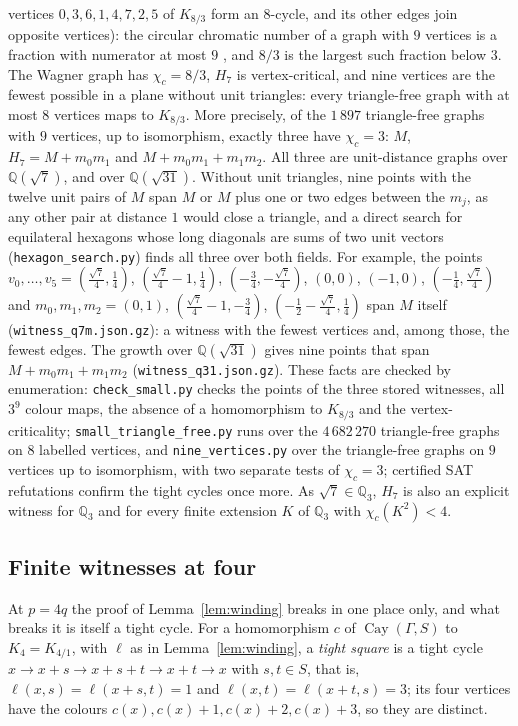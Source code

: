 \documentclass[11pt,a4paper]{amsart}
\theoremstyle{remark}
\newcommand{\Q}{\mathbb{Q}}
\newcommand{\Cay}{\operatorname{Cay}}
\begin{document}
vertices $0,3,6,1,4,7,2,5$ of $K_{8/3}$ form an $8$-cycle, and its other edges join opposite vertices): the
circular chromatic number of a graph with $9$ vertices is a fraction with numerator at most $9$
\cite{Vince,BondyHell,Zhu}, and
$8/3$ is the largest such fraction below $3$. The Wagner graph has $\chi_c=8/3$, $H_7$ is vertex-critical, and nine
vertices are the fewest possible in a plane without unit triangles: every triangle-free graph with at most $8$
vertices maps to $K_{8/3}$. More precisely, of the $1\,897$ triangle-free graphs with $9$ vertices, up to
isomorphism, exactly three have $\chi_c=3$: $M$, $H_7=M+m_0m_1$ and $M+m_0m_1+m_1m_2$. All three are unit-distance
graphs over $\Q(\sqrt7)$, and over $\Q(\sqrt{31})$. Without unit triangles, nine points with the twelve unit pairs of
$M$ span $M$ or $M$ plus one or two edges between the $m_j$, as any other pair at distance $1$ would close a
triangle, and a direct search for equilateral hexagons whose long diagonals are sums of two unit vectors
(\nolinkurl{hexagon_search.py}) finds all three over both fields. For example, the points
$v_0,\dots,v_5=(\frac{\sqrt7}4,\frac14)$, $(\frac{\sqrt7}4-1,\frac14)$, $(-\frac34,-\frac{\sqrt7}4)$, $(0,0)$,
$(-1,0)$, $(-\frac14,\frac{\sqrt7}4)$ and $m_0,m_1,m_2=(0,1)$, $(\frac{\sqrt7}4-1,-\frac34)$,
$(-\frac12-\frac{\sqrt7}4,\frac14)$ span $M$ itself (\nolinkurl{witness_q7m.json.gz}): a witness with the fewest
vertices and, among those, the fewest edges. The growth over $\Q(\sqrt{31})$ gives nine points that span
$M+m_0m_1+m_1m_2$ (\nolinkurl{witness_q31.json.gz}). These facts are checked by enumeration:
\nolinkurl{check_small.py} checks the points of the three stored witnesses, all $3^9$ colour maps, the absence of a
homomorphism to $K_{8/3}$ and the vertex-criticality; \nolinkurl{small_triangle_free.py} runs over the $4\,682\,270$
triangle-free graphs on $8$ labelled vertices, and \nolinkurl{nine_vertices.py} over the triangle-free graphs on $9$
vertices up to isomorphism, with two separate tests of $\chi_c=3$; certified SAT refutations confirm the tight
cycles once more. As $\sqrt7\in\Q_3$, $H_7$ is also an explicit witness for $\Q_3$ and for every finite extension $K$
of $\Q_3$ with $\chi_c(K^2)<4$.

\subsection*{Finite witnesses at four}
At $p=4q$ the proof of Lemma~\ref{lem:winding} breaks in one place only, and what breaks it is itself a tight cycle.
For a homomorphism $c$ of $\Cay(\Gamma,S)$ to $K_4=K_{4/1}$, with $\ell$ as in Lemma~\ref{lem:winding}, a
\emph{tight square} is a tight cycle $x\to x+s\to x+s+t\to x+t\to x$ with $s,t\in S$, that is,
$\ell(x,s)=\ell(x+s,t)=1$ and $\ell(x,t)=\ell(x+t,s)=3$; its four vertices have the colours $c(x),c(x)+1,c(x)+2,
c(x)+3$, so they are distinct.
\end{document}
